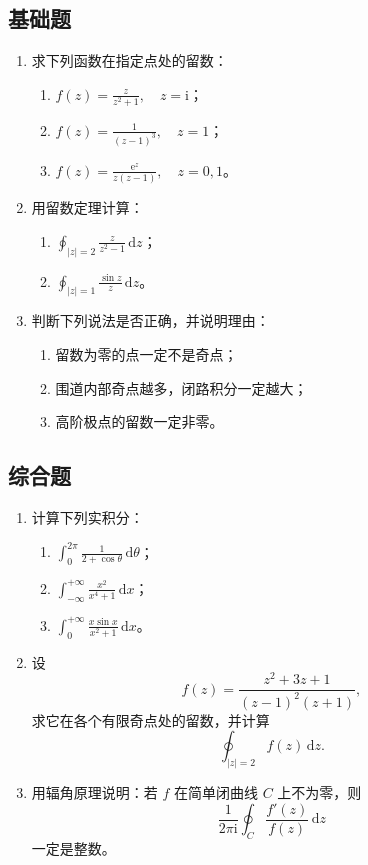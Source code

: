 \subsection*{基础题}

\begin{enumerate}
    \item 求下列函数在指定点处的留数：
    \begin{enumerate}
        \item $\displaystyle f(z)=\frac{z}{z^2+1},\quad z=\mathrm{i}$；
        \item $\displaystyle f(z)=\frac{1}{(z-1)^3},\quad z=1$；
        \item $\displaystyle f(z)=\frac{\mathrm{e}^z}{z(z-1)},\quad z=0,1$。
    \end{enumerate}

    \item 用留数定理计算：
    \begin{enumerate}
        \item $\displaystyle \oint_{|z|=2}\frac{z}{z^2-1}\,\mathrm{d}z$；
        \item $\displaystyle \oint_{|z|=1}\frac{\sin z}{z}\,\mathrm{d}z$。
    \end{enumerate}

    \item 判断下列说法是否正确，并说明理由：
    \begin{enumerate}
        \item 留数为零的点一定不是奇点；
        \item 围道内部奇点越多，闭路积分一定越大；
        \item 高阶极点的留数一定非零。
    \end{enumerate}
\end{enumerate}

\subsection*{综合题}

\begin{enumerate}
    \item 计算下列实积分：
    \begin{enumerate}
        \item $\displaystyle \int_0^{2\pi}\frac{1}{2+\cos\theta}\,\mathrm{d}\theta$；
        \item $\displaystyle \int_{-\infty}^{+\infty}\frac{x^2}{x^4+1}\,\mathrm{d}x$；
        \item $\displaystyle \int_0^{+\infty}\frac{x\sin x}{x^2+1}\,\mathrm{d}x$。
    \end{enumerate}

    \item 设
    \[
        f(z)=\frac{z^2+3z+1}{(z-1)^2(z+1)},
    \]
    求它在各个有限奇点处的留数，并计算
    \[
        \oint_{|z|=2} f(z)\,\mathrm{d}z.
    \]

    \item 用辐角原理说明：若 $f$ 在简单闭曲线 $C$ 上不为零，则
    \[
        \frac{1}{2\pi \mathrm{i}}\oint_C \frac{f'(z)}{f(z)}\,\mathrm{d}z
    \]
    一定是整数。
\end{enumerate}

